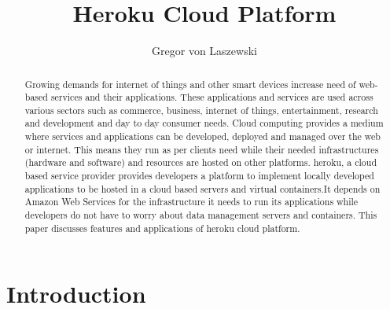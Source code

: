 
\title{Heroku Cloud Platform}


\author{Gregor von Laszewski}


\renewcommand{\shortauthors}{J. M. Khatiwada}


\begin{abstract}
Growing demands for internet of things and other smart devices increase
need of web-based services and their applications. These applications and
services are  used across various sectors such as commerce, business, 
internet of things, entertainment, research and development and day to day 
consumer needs. Cloud computing provides a medium where services and 
applications can be developed, deployed and managed over the web or internet.
This means they run as per clients need while their needed infrastructures 
(hardware and software) and resources are hosted on other platforms. heroku,
 a cloud based service provider provides developers a platform to implement 
locally developed applications to be hosted in a cloud based servers and 
virtual containers.It depends on Amazon Web Services for the infrastructure 
it needs to run its applications while developers do not have to worry about
 data management servers and containers. This paper discusses features and
 applications of heroku cloud platform.
\end{abstract}



\maketitle



\section{Introduction}


